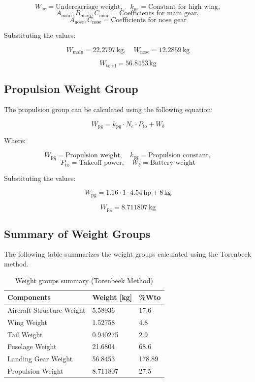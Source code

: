 \documentclass[12pt]{report}
\begin{document}
\[
W_{\text{uc}} = \text{Undercarriage weight}, \quad k_{\text{uc}} = \text{Constant for high wing},
\]
\[
A_{\text{main}}, B_{\text{main}}, C_{\text{main}} = \text{Coefficients for main gear},
\]
\[
A_{\text{nose}}, C_{\text{nose}} = \text{Coefficients for nose gear}
\]


Substituting the values:

\[
W_{\text{main}} = 22.2797 \, \text{kg}, \quad W_{\text{nose}} = 12.2859 \, \text{kg}
\]

\[
W_{\text{total}} = 56.8453 \, \text{kg}
\]

\subsection{Propulsion Weight Group}

The propulsion group can be calculated using the following equation:

\[
W_{\text{pg}} = k_{\text{pg}} \cdot N_e \cdot P_{\text{to}} + W_b
\]

Where:

\[
W_{\text{pg}} = \text{Propulsion weight}, \quad k_{\text{pg}} = \text{Propulsion constant}, 
\]
\[
P_{\text{to}} = \text{Takeoff power}, \quad W_b = \text{Battery weight}
\]


Substituting the values:

\[
W_{\text{pg}} = 1.16 \cdot 1 \cdot 4.54 \, \text{hp} + 8 \, \text{kg}
\]

\[
W_{\text{pg}} = 8.711807 \, \text{kg}
\]
\newpage
\subsection{Summary of Weight Groups}

The following table summarizes the weight groups calculated using the Torenbeek method.

\begin{table}[h!]
	\centering
	\begin{tabular}{|l|l|l|}
		\hline
		\textbf{Components} & \textbf{Weight [kg]} & \textbf{\%Wto} \\ \hline
		Aircraft Structure Weight & 5.58936 & 17.6 \\ \hline
		Wing Weight & 1.52758 & 4.8 \\ \hline
		Tail Weight & 0.940275 & 2.9 \\ \hline
		Fuselage Weight & 21.6804 & 68.6 \\ \hline
		Landing Gear Weight & 56.8453 & 178.89 \\ \hline
		Propulsion Weight & 8.711807 & 27.5 \\ \hline
	\end{tabular}
	\caption{Weight groups summary (Torenbeek Method)}
\end{table}
\end{document}
